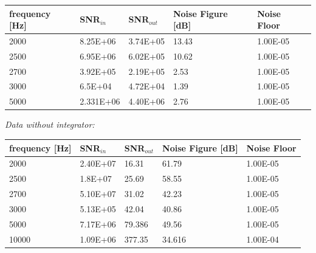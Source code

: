 \begin{center}
\begin{tabular}{|m{3cm}|m{3cm}|m{2.5cm}|m{3.2cm}|m{2cm}|} 
\hline
frequency [Hz]& SNR$_{in}$ & SNR$_{out}$ & Noise Figure [dB] & Noise Floor \\ 
\hline \hline
2000 &  8.25E+06 &  3.74E+05 & 13.43 & 1.00E-05 \\ 
\hline
2500 & 6.95E+06 & 6.02E+05 & 10.62 & 1.00E-05 \\ 
\hline
2700 & 3.92E+05 & 2.19E+05 & 2.53 & 1.00E-05 \\ 
\hline
3000 & 6.5E+04 & 4.72E+04 & 1.39 & 1.00E-05 \\ 
\hline
5000 & 2.331E+06 & 4.40E+06 & 2.76 & 1.00E-05 \\ 
\hline
\end{tabular}
\end{center}


\textit{Data without integrator:}
\begin{center}
\begin{tabular}{|m{3cm}|m{3cm}|m{2.5cm}|m{3.2cm}|m{2cm}|} 
\hline
frequency [Hz]& SNR$_{in}$ & SNR$_{out}$ & Noise Figure [dB] & Noise Floor \\ 
\hline \hline
2000 & 2.40E+07 & 16.31 & \cellcolor{blue!25}61.79 & 1.00E-05 \\ 
\hline
2500 & 1.8E+07 & 25.69 & \cellcolor{blue!25}58.55 & 1.00E-05 \\ 
\hline
2700 & 5.10E+07 & 31.02 & \cellcolor{blue!25}42.23 & 1.00E-05 \\ 
\hline
3000 & 5.13E+05 & 42.04 & \cellcolor{blue!25}40.86 & 1.00E-05 \\ 
\hline
5000 & 7.17E+06 & 79.386 & \cellcolor{blue!25}49.56 & 1.00E-05 \\ 
\hline
10000 & 1.09E+06 & 377.35 & \cellcolor{red!25}34.616 & 1.00E-04 \\ 
\hline

\end{tabular}
\end{center}


